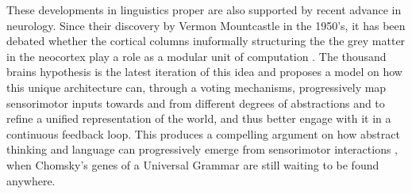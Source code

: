 These developments in linguistics proper are also supported by recent advance in neurology. Since their discovery by Vermon Mountcastle in the 1950's, it has been debated whether the cortical columns inuformally structuring the the grey matter in the neocortex play a role as a modular unit of computation \parencite{horton_cortical_2005}. The thousand brains hypothesis \parencite{hawkins_theory_2017, hawkins_thousand_2021} is the latest iteration of this idea and proposes a model on how this unique architecture can, through a voting mechanisms, progressively map sensorimotor inputs towards and from different degrees of abstractions and to refine a unified representation of the world, and thus better engage with it in a continuous feedback loop. This produces a compelling argument on how abstract thinking and language can progressively emerge from sensorimotor interactions \parencite{constantinescu_organizing_2016}, when Chomsky's genes of a Universal Grammar are still waiting to be found anywhere. \\

